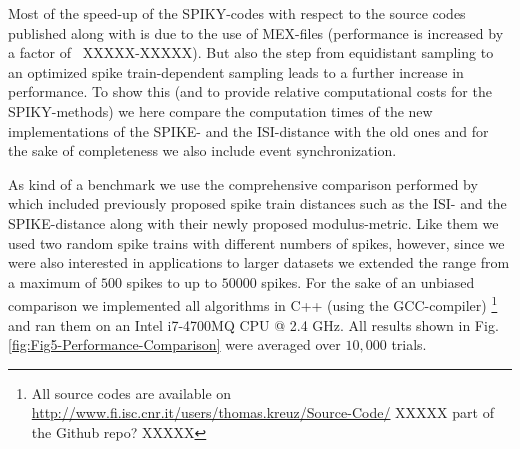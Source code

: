\documentclass[10pt,twocolumn]{elsart5p}
\begin{document}

Most of the speed-up of the SPIKY-codes with respect to the source codes published along with \citet{Kreuz13} is due to the use of MEX-files (performance is increased by a factor of ~XXXXX-XXXXX). But also the step from equidistant sampling to an optimized spike train-dependent sampling leads to a further increase in performance. To show this (and to provide relative computational costs for the SPIKY-methods) we here compare the computation times of the new implementations of the SPIKE- and the ISI-distance with the old ones and for the sake of completeness we also include event synchronization.

As kind of a benchmark we use the comprehensive comparison performed by \cite{Rusu14} which included previously proposed spike train distances such as the ISI- and the SPIKE-distance along with their newly proposed modulus-metric. Like them we used two random spike trains with different numbers of spikes, however, since we were also interested in applications to larger datasets we extended the range from a maximum of $500$ spikes to up to $50000$ spikes. For the sake of an unbiased comparison we implemented all algorithms in C++ (using the GCC-compiler) \footnote{All source codes are available on \url{http://www.fi.isc.cnr.it/users/thomas.kreuz/Source-Code/} XXXXX part of the Github repo? XXXXX} and ran them on an Intel i7-4700MQ CPU @ 2.4 GHz. All results shown in Fig. \ref{fig:Fig5-Performance-Comparison} were averaged over $10,000$ trials.
\end{document}
